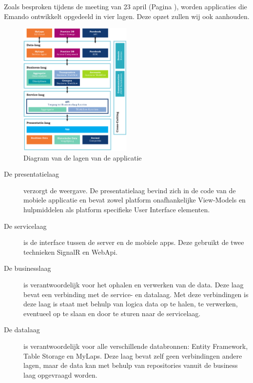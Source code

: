 Zoals besproken tijdens de meeting van 23 april (Pagina \pageref{sec:meeting-23-apr}), worden applicaties die Emando ontwikkelt opgedeeld in vier lagen. Deze opzet zullen wij ook aanhouden.

\begin{figure}[ht]
  \begin{center}
    \includegraphics[width=0.5\textwidth]{style/images/Layers}
  \end{center}
  \caption{Diagram van de lagen van de applicatie}
  \label{fig:diagram-layers}
\end{figure}

\begin{description}
\item[De presentatielaag] verzorgt de weergave. De presentatielaag bevind zich in de code van de mobiele applicatie en bevat zowel platform onafhankelijke View-Models en hulpmiddelen als platform specifieke User Interface elementen.
\item[De servicelaag] is de interface tussen de server en de mobiele apps. Deze gebruikt de twee technieken SignalR en WebApi.
\item[De businesslaag] is verantwoordelijk voor het ophalen en verwerken van de data. Deze laag bevat een verbinding met de service- en datalaag. Met deze verbindingen is deze laag is staat met behulp van logica data op te halen, te verwerken, eventueel op te slaan en door te sturen naar de servicelaag. 
\item[De datalaag] is verantwoordelijk voor alle verschillende databronnen: Entity Framework, Table Storage en MyLaps. Deze laag bevat zelf geen verbindingen andere lagen, maar de data kan met behulp van repositories vanuit de business laag opgevraagd worden.

\end{description}

